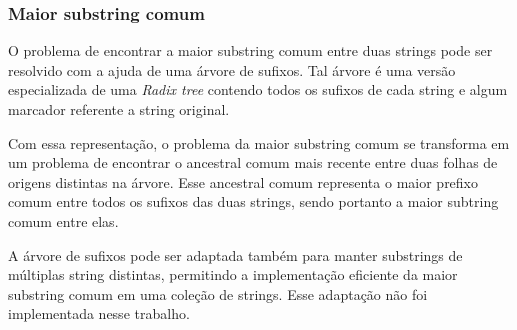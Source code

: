     \subsubsection{Maior substring comum}

        O problema de encontrar a maior substring comum entre duas strings pode ser resolvido com a ajuda de uma árvore de sufixos. Tal árvore é uma versão especializada de uma \textit{Radix tree} contendo todos os sufixos de cada string e algum marcador referente a string original.

        Com essa representação, o problema da maior substring comum se transforma em um problema de encontrar o ancestral comum mais recente entre duas folhas de origens distintas na árvore. Esse ancestral comum representa o maior prefixo comum entre todos os sufixos das duas strings, sendo portanto a maior subtring comum entre elas.

        A árvore de sufixos pode ser adaptada também para manter substrings de múltiplas string distintas, permitindo a implementação eficiente da maior substring comum em uma coleção de strings. Esse adaptação não foi implementada nesse trabalho.
